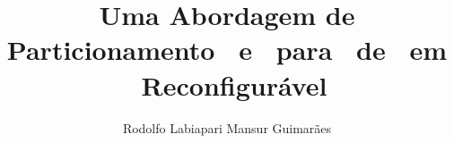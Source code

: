 \documentclass[bind,a4paper,table]{mythesis}
\begin{document}
\let\cleardoublepage\clearpage
\title{Uma Abordagem de Particionamento \Hardware\ e \Software\ para \Design\ de \Wearables\ em \Hardware\ Reconfigurável}
\author{Rodolfo Labiapari Mansur Guimarães}%

\begin{frontmatter}
	
\end{frontmatter}

\begin{mainmatter}
  	
	\let\cleardoublepage\clearpage
    
\end{mainmatter}

\begin{appendices}
\begin{flushleft}

\end{flushleft}
  	
\end{appendices}
\let\cleardoublepage\clearpage
\begin{backmatter}
	
\end{backmatter}

\end{document}
